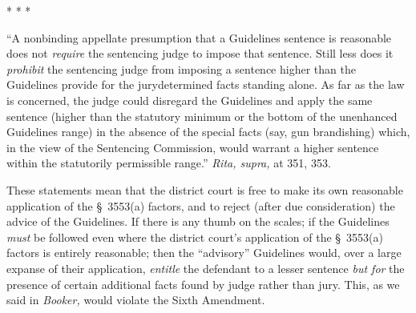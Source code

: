     * * *

      ``A nonbinding appellate presumption that a Guidelines sentence
    is reasonable does not \emph{require} the sentencing judge to impose
    that sentence. Still less does it \emph{prohibit} the sentencing judge
    from imposing a sentence higher than the Guidelines provide for the
    jurydetermined facts standing alone. As far as the law is concerned,
    the judge could disregard the Guidelines and apply the same sentence
    (higher than the statutory minimum or the bottom of the unenhanced
    Guidelines range) in the absence of the special facts (say, gun
    brandishing) which, in the view of the Sentencing Commission,
    would warrant a higher sentence within the statutorily permissible
    range.'' \emph{Rita, supra,} at 351, 353.

  These statements mean that the district court is free to make its
own reasonable application of the \S~3553(a) factors, and to reject
(after due consideration) the advice of the Guidelines. If there is
any thumb on the scales; if the Guidelines \emph{must} be followed even
where the district court's application of the \S~3553(a) factors is
entirely reasonable; then the ``advisory'' Guidelines would, over
a large expanse of their application, \emph{entitle} the defendant to a
lesser sentence \newpage  \emph{but for} the presence of certain additional
facts found by judge rather than jury. This, as we said in \emph{Booker,}
would violate the Sixth Amendment.
